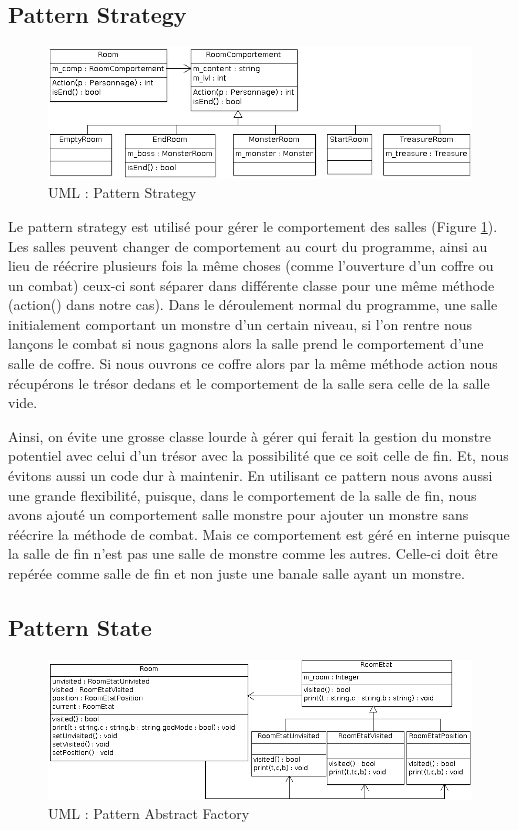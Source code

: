 \documentclass[a4paper]{article}
\begin{document}
    \subsection{Pattern Strategy}
      \begin{figure}[h]
        \centering
        \includegraphics[width=15cm]{./Strategy_UML.png}
        \caption{\label{fig:Strategy_UML} UML : Pattern Strategy}
      \end{figure}

Le pattern strategy est utilisé pour gérer le comportement des salles (Figure \ref{fig:Strategy_UML}\footnotemark[1]).
Les salles peuvent changer de comportement au court du programme, ainsi au lieu de réécrire plusieurs fois la même choses (comme l'ouverture d'un coffre ou un combat) ceux-ci sont séparer dans différente classe pour une même méthode (action() dans notre cas).
Dans le déroulement normal du programme, une salle initialement comportant un monstre d'un certain niveau, si l'on rentre nous lançons le combat si nous gagnons alors la salle prend le comportement d'une salle de coffre.
Si nous ouvrons ce coffre alors par la même méthode action nous récupérons le trésor dedans et le comportement de la salle sera celle de la salle vide.

Ainsi, on évite une grosse classe lourde à gérer qui ferait la gestion du monstre potentiel avec celui d'un trésor avec la possibilité que ce soit celle de fin.
Et, nous évitons aussi un code dur à maintenir.
En utilisant ce pattern nous avons aussi une grande flexibilité, puisque, dans le comportement de la salle de fin, nous avons ajouté un comportement salle monstre pour ajouter un monstre sans réécrire la méthode de combat.
Mais ce comportement est géré en interne puisque la salle de fin n'est pas une salle de monstre comme les autres.
Celle-ci doit être repérée comme salle de fin et non juste une banale salle ayant un monstre.


    \subsection{Pattern State}
      \begin{figure}[h]
        \centering
        \includegraphics[width=15cm]{./State_UML.png}
        \caption{\label{fig:State_UML} UML : Pattern Abstract Factory}
      \end{figure}
\end{document}
